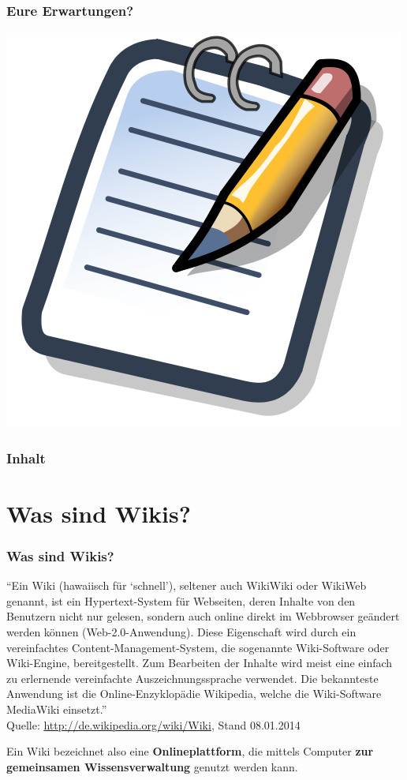 \documentclass{beamer}
\begin{document}
\begin{frame}
  \frametitle{Eure Erwartungen?}
  
  \onslide<+->
  
  \begin{center}
    \includegraphics[width=0.7\linewidth]{500px-Notepad_icon}
  \end{center}
\end{frame}

\begin{frame}
  \frametitle{Inhalt}
  \tableofcontents
\end{frame}

\section{Was sind Wikis?}

\begin{frame}
  \frametitle{Was sind Wikis?}

  \onslide<+->
  
  
  \begin{block}{}
    {\small \enquote{Ein Wiki (hawaiisch für \enquote{schnell}), seltener auch
        WikiWiki oder WikiWeb genannt, ist ein Hypertext-System für Webseiten,
        deren Inhalte von den Benutzern nicht nur gelesen, sondern auch online
        direkt im Webbrowser geändert werden können (Web-2.0-Anwendung). Diese
        Eigenschaft wird durch ein vereinfachtes Content-Management-System, die
        sogenannte Wiki-Software oder Wiki-Engine, bereitgestellt. Zum
        Bearbeiten der Inhalte wird meist eine einfach zu erlernende
        vereinfachte Auszeichnungssprache verwendet. Die bekannteste Anwendung
        ist die Online-Enzyklopädie Wikipedia, welche die Wiki-Software
        MediaWiki einsetzt.}  \\
      Quelle: \url{http://de.wikipedia.org/wiki/Wiki}, Stand 08.01.2014}
  \end{block}
  
  \begin{block}{}
    Ein Wiki bezeichnet also eine \textbf{Onlineplattform}, die mittels
    Computer \textbf{zur gemeinsamen Wissensverwaltung} genutzt werden
    kann.
  \end{block}
\end{frame}
\end{document}
